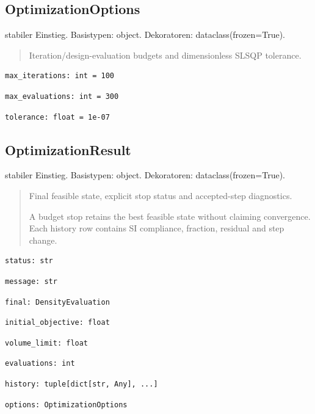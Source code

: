 \subsection{OptimizationOptions}
stabiler Einstieg.
Basistypen: object. Dekoratoren: dataclass(frozen=True).
\begin{quote}
Iteration/design-evaluation budgets and dimensionless SLSQP tolerance.
\end{quote}
\begin{lstlisting}
max_iterations: int = 100
\end{lstlisting}
\begin{lstlisting}
max_evaluations: int = 300
\end{lstlisting}
\begin{lstlisting}
tolerance: float = 1e-07
\end{lstlisting}
\subsection{OptimizationResult}
stabiler Einstieg.
Basistypen: object. Dekoratoren: dataclass(frozen=True).
\begin{quote}
Final feasible state, explicit stop status and accepted-step diagnostics.\par A budget stop retains the best feasible state without claiming convergence. Each history row contains SI compliance, fraction, residual and step change.
\end{quote}
\begin{lstlisting}
status: str
\end{lstlisting}
\begin{lstlisting}
message: str
\end{lstlisting}
\begin{lstlisting}
final: DensityEvaluation
\end{lstlisting}
\begin{lstlisting}
initial_objective: float
\end{lstlisting}
\begin{lstlisting}
volume_limit: float
\end{lstlisting}
\begin{lstlisting}
evaluations: int
\end{lstlisting}
\begin{lstlisting}
history: tuple[dict[str, Any], ...]
\end{lstlisting}
\begin{lstlisting}
options: OptimizationOptions
\end{lstlisting}

